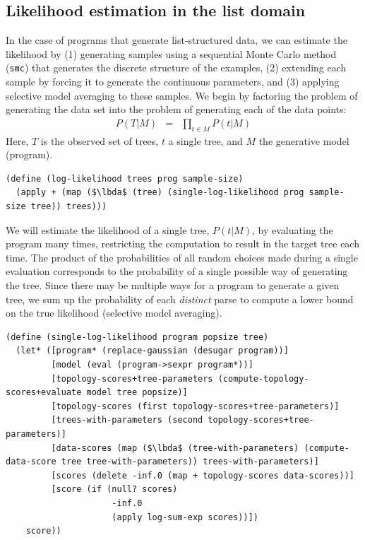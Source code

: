 \documentclass[a4paper,10pt]{article}
\newcommand{\lbda}{\color[rgb]{0,.3,.7} \lambda}
\begin{document}
\subsection{Likelihood estimation in the list domain}

In the case of programs that generate list-structured data, we can estimate the likelihood by (1) generating samples using a sequential Monte Carlo method (\texttt{smc}) that generates the discrete structure of the examples, (2) extending each sample by forcing it to generate the continuous parameters, and (3) applying selective model averaging to these samples. We begin by factoring the problem of generating the data set into the problem of generating each of the data points:
\begin{eqnarray}
P(T|M) &=& \prod_{t \in M}P(t|M)
\end{eqnarray}
Here, $T$ is the observed set of trees, $t$ a single tree, and $M$ the generative model (program).
\begin{lstlisting}[frame=trbl]
(define (log-likelihood trees prog sample-size)
  (apply + (map ($\lbda$ (tree) (single-log-likelihood prog sample-size tree)) trees)))
\end{lstlisting}
We will estimate the likelihood of a single tree, $P(t|M)$, by evaluating the program many times, restricting the computation to result in the target tree each time. The product of the probabilities of all random choices made during a single evaluation corresponds to the probability of a single possible way of generating the tree. Since there may be multiple ways for a program to generate a given tree, we sum up the probability of each {\em distinct} parse to compute a lower bound on the true likelihood (selective model averaging).
\begin{lstlisting}[frame=trbl]
(define (single-log-likelihood program popsize tree)
  (let* ([program* (replace-gaussian (desugar program))]
         [model (eval (program->sexpr program*))]
         [topology-scores+tree-parameters (compute-topology-scores+evaluate model tree popsize)]
         [topology-scores (first topology-scores+tree-parameters)]
         [trees-with-parameters (second topology-scores+tree-parameters)]
         [data-scores (map ($\lbda$ (tree-with-parameters) (compute-data-score tree tree-with-parameters)) trees-with-parameters)]
         [scores (delete -inf.0 (map + topology-scores data-scores))]
         [score (if (null? scores)
                     -inf.0
                     (apply log-sum-exp scores))])
    score))
\end{lstlisting}
\end{document}
